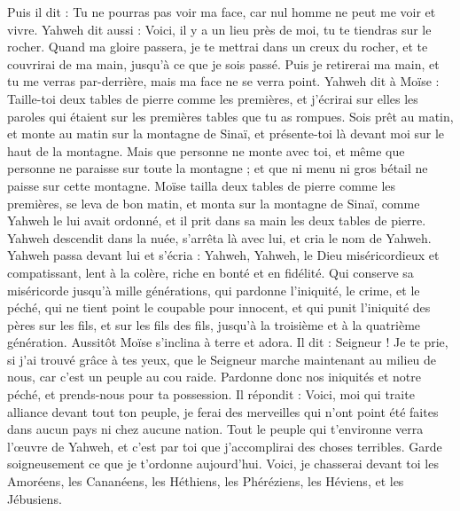 \begin{multicols}{2}
Puis il dit : Tu ne pourras pas voir ma face, car nul homme ne peut me voir et vivre.
Yahweh dit aussi : Voici, il y a un lieu près de moi, tu te tiendras sur le rocher.
Quand ma gloire passera, je te mettrai dans un creux du rocher, et te couvrirai de ma main, jusqu’à ce que je sois passé.
Puis je retirerai ma main, et tu me verras par-derrière, mais ma face ne se verra point.
\VerseOne{}Yahweh dit à Moïse : Taille-toi deux tables de pierre comme les premières, et j'écrirai sur elles les paroles qui étaient sur les premières tables que tu as rompues.
Sois prêt au matin, et monte au matin sur la montagne de Sinaï, et présente-toi là devant moi sur le haut de la montagne.
Mais que personne ne monte avec toi, et même que personne ne paraisse sur toute la montagne ; et que ni menu ni gros bétail ne paisse sur cette montagne.
Moïse tailla deux tables de pierre comme les premières, se leva de bon matin, et monta sur la montagne de Sinaï, comme Yahweh le lui avait ordonné, et il prit dans sa main les deux tables de pierre.
Yahweh descendit dans la nuée, s'arrêta là avec lui, et cria le nom de Yahweh.
Yahweh passa devant lui et s’écria : Yahweh, Yahweh, le Dieu miséricordieux et compatissant, lent à la colère, riche en bonté et en fidélité.
Qui conserve sa miséricorde jusqu’à mille générations, qui pardonne l'iniquité, le crime, et le péché, qui ne tient point le coupable pour innocent, et qui punit l'iniquité des pères sur les fils, et sur les fils des fils, jusqu’à la troisième et à la quatrième génération.
Aussitôt Moïse s’inclina à terre et adora.
Il dit : Seigneur ! Je te prie, si j'ai trouvé grâce à tes yeux, que le Seigneur marche maintenant au milieu de nous, car c'est un peuple au cou raide. Pardonne donc nos iniquités et notre péché, et prends-nous pour ta possession.
Il répondit : Voici, moi qui traite alliance devant tout ton peuple, je ferai des merveilles qui n'ont point été faites dans aucun pays ni chez aucune nation. Tout le peuple qui t’environne verra l'œuvre de Yahweh, et c’est par toi que j’accomplirai des choses terribles.
Garde soigneusement ce que je t’ordonne aujourd'hui. Voici, je chasserai devant toi les Amoréens, les Cananéens, les Héthiens, les Phéréziens, les Héviens, et les Jébusiens.

\end{multicols}
